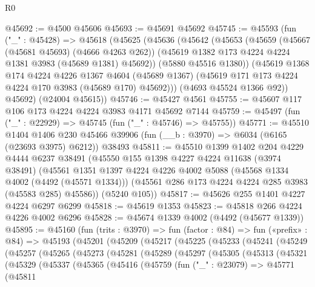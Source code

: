 \begin{lexlean}{R0}
\begin{coremodule}
@45692 := @4500 @45606
@45693 := @45691 @45692
@45745 := @45593
    (fun ("_" : @45428) =>
    @45618
      (@45625
        (@45636
          (@45642
            (@45653
              (@45659
                (@45667 (@45681 @45693) (@4666 @4263 @262))
                (@45619 @1382 @173 @4224 @4224 @1381 @3983 (@45689 @1381) @45692))
              (@5880 @45516 @1380))
            (@45619
              @1368
              @174
              @4224
              @4226
              @1367
              @4604
              (@45689 @1367)
              (@45619 @171 @173 @4224 @4224 @170 @3983 (@45689 @170) @45692)))
          (@4693 @45524 @1366 @92))
        @45692)
      (@24004 @45615))
@45746 := @45427 @4561
@45755 := @45607 @117 @106 @173 @4224 @4224 @3983 @4171 @45692 @7144
@45759 := @45497 (fun ("_" : @22929) => @45745 (fun ("_" : @45746) => @45755))
@45771 := @45510
    @1404
    @1406
    @230
    @45466
    @39906
    (fun (__b : @3970) => @6034 (@6165 (@23693 @3975) @6212))
    @38493
@45811 := @45510
    @1399
    @1402
    @204
    @4229
    @4444
    @6237
    @38491
    (@45550
      @155
      @1398
      @4227
      @4224
      @11638
      (@3974 @38491)
      (@45561
        @1351
        @1397
        @4224
        @4226
        @4002
        @5088
        (@45568 @1334 @4002 (@4492 (@45571 @1334)))
        (@45561 @286 @173 @4224 @4224 @285 @3983 (@45583 @285) @45586))
      (@5240 @105))
@45817 := @45626 @255 @1401 @4227 @4224 @6297 @6299
@45818 := @45619 @1353
@45823 := @45818 @266 @4224 @4226 @4002 @6296
@45828 := @45674 @1339 @4002 (@4492 (@45677 @1339))
@45895 := @45160
    (fun (trits : @3970) =>
    fun (factor : @84) =>
    fun («prefix» : @84) =>
    @45193
      (@45201
        (@45209
          (@45217
            (@45225
              (@45233
                (@45241
                  (@45249
                    (@45257
                      (@45265
                        (@45273
                          (@45281
                            (@45289
                              (@45297
                                (@45305
                                  (@45313
                                    (@45321
                                      (@45329
                                        (@45337
                                          (@45365
                                            (@45416
                                              (@45759
                                                (fun ("_" : @23079) =>
                                                @45771
                                                  (@45811

\end{coremodule}
\end{lexlean}
